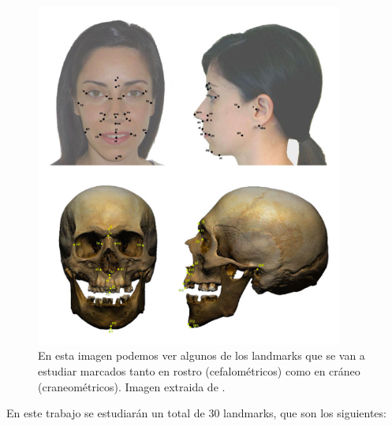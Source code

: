 \begin{figure}[!h]
    \centering
    \includegraphics[width=0.9\textwidth]{img/marcado_landmarks.png}
    \caption{En esta imagen podemos ver algunos de los landmarks que se van a estudiar marcados tanto en rostro (cefalométricos) como en cráneo (craneométricos). Imagen extraida de \cite{damas2020handbook}.}
\end{figure}


\newpage

\noindent En este trabajo se estudiarán un total de $30$ landmarks, que son los siguientes: 


